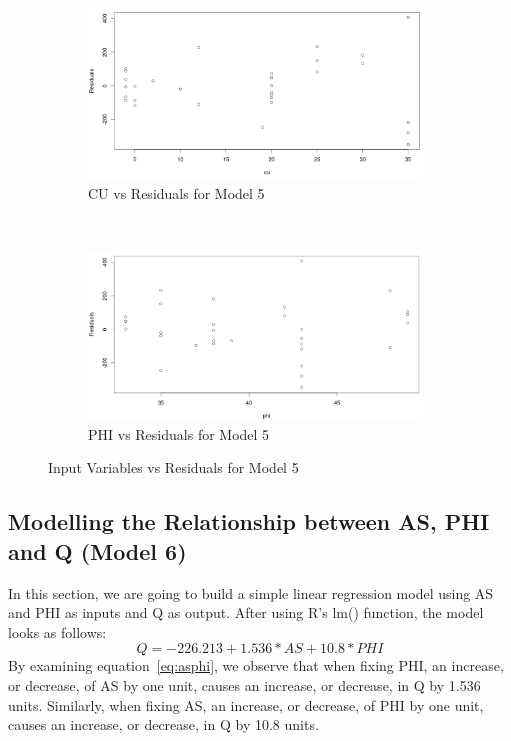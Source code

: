 \documentclass[a4paper,12pt, english]{article}
\begin{document}
\begin{figure}[H]
        \centering
        \begin{subfigure}[b]{0.85\textwidth}
                \includegraphics[width=0.96986\textwidth]{mod5-resid1}
  		\caption{CU vs Residuals for Model 5}
  		\label{fig:mod5-resid1}
        \end{subfigure}%
        ~ %
        
        \begin{subfigure}[b]{0.85\textwidth}
                \includegraphics[width=0.96986\textwidth]{mod5-resid2}
 		 \caption{PHI vs Residuals for Model 5}
 		 \label{fig:mod5-resid2}
        \end{subfigure}
        
        \caption{Input Variables vs Residuals for Model 5}
        \label{fig:mod5-resids}
\end{figure}


\subsection{Modelling the Relationship between AS, PHI and Q (Model 6)} \label{sec:asphimodel}
In this section, we are going to build a simple linear regression model using AS and PHI as inputs and Q as output. After using R's lm() function, the model looks as follows:\\
\begin{equation}
\label{eq:asphi}
Q = -226.213  +      1.536*AS   +    10.8*PHI
\end{equation}       
By examining equation~\ref{eq:asphi}, we observe that when fixing PHI, an increase, or decrease, of AS by one unit, causes an increase, or decrease, in Q by 1.536 units.
Similarly, when fixing AS, an increase, or decrease, of PHI by one unit, causes an increase, or decrease, in Q by 10.8 units.
\end{document}
